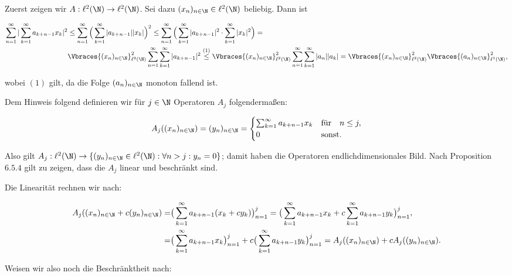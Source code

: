 \begin{solution}

Zuerst zeigen wir $A: \ell^2(\N) \rightarrow \ell^2(\N)$. Sei dazu $(x_n)_{n \in \N} \in \ell^2(\N)$
beliebig. Dann ist

\begin{align*}
  \sum_{n=1}^\infty |\sum_{k=1}^\infty a_{k+n-1}x_k|^2 &\leq
  \sum_{n=1}^\infty \Big( \sum_{k=1}^\infty |a_{k+n-1}| |x_k|\Big)^2 \leq
  \sum_{n=1}^\infty \Big( \sum_{k=1}^\infty |a_{k+n-1}|^2 \cdot \sum_{k=1}^\infty |x_k|^2\Big) = \\
  & \Vbraces{(x_n)_{n \in \N}}_{\ell^2(\N)}^2 \sum_{n=1}^\infty \sum_{k=1}^\infty |a_{k+n-1}|^2 \stackrel{(1)}{\leq}
  \Vbraces{(x_n)_{n \in \N}}_{\ell^2(\N)}^2 \sum_{n=1}^\infty \sum_{k=1}^\infty |a_n| |a_k| =
  \Vbraces{(x_n)_{n \in \N}}_{\ell^2(\N)}^2 \Vbraces{(a_n)_{n \in \N}}_{\ell^1(\N)}^2,
\end{align*}

wobei $(1)$ gilt, da die Folge $(a_n)_{n \in \N}$ monoton fallend ist.

Dem Hinweis folgend definieren wir für $j \in \N$ Operatoren $A_j$ folgendermaßen:

\begin{align*}
  A_j((x_n)_{n\in \N}) = (y_n)_{n \in \N} = \begin{cases}
  \sum_{k=1}^{\infty} a_{k+n-1}x_k & \text{für} \quad n \leq j, \\
  0 & \text{sonst}.
  \end{cases}
\end{align*}

Also gilt $A_j: \ell^2(\N) \rightarrow \{(y_n)_{n \in \N} \in \ell^2(\N): \forall n > j:
y_n = 0\}$; damit haben die Operatoren endlichdimensionales Bild. Nach Proposition
$6.5.4$ gilt zu zeigen, dass die $A_j$ linear und beschränkt sind.

Die Linearität rechnen wir nach:

\begin{align*}
  A_j((x_n)_{n \in \N} + c (y_n)_{n \in \N}) =& \big(\sum_{k=1}^{\infty}a_{k+n-1}
  (x_k+c y_k) \big)_{n=1}^j = \big(\sum_{k=1}^{\infty}a_{k+n-1}
  x_k+ c \sum_{k=1}^{\infty}a_{k+n-1}y_k \big)_{n=1}^j,\\
  =&\big(\sum_{k=1}^{\infty}a_{k+n-1}
  x_k \big)_{n=1}^j + c\big(\sum_{k=1}^\infty a_{k+n-1}y_k \big)_{n=1}^j
  = A_j((x_n)_{n \in \N})+ c A_j((y_n)_{n \in \N}).
\end{align*}

Weisen wir also noch die Beschränktheit nach:


\end{solution}
